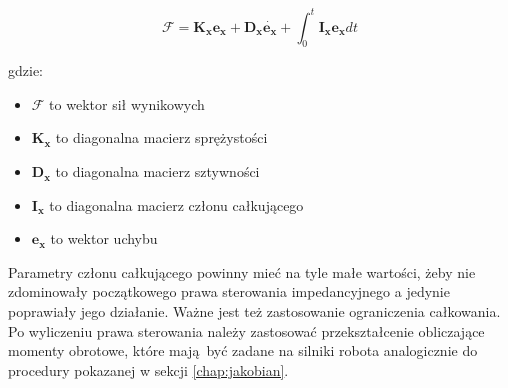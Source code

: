 \begin{equation}
\boldsymbol{\mathcal{F}} = \boldsymbol{K_x}\boldsymbol{e_x} + \boldsymbol{D_x}\dot{\boldsymbol{e_x}} + \int_{0}^{t}  \boldsymbol{I_x}\boldsymbol{e_x}dt
\end{equation}

gdzie:
\begin{itemize}
	\item $\boldsymbol{\mathcal{F}}$ to wektor sił wynikowych
	\item $\boldsymbol{K_x}$ to diagonalna macierz sprężystości
	\item $\boldsymbol{D_x}$ to diagonalna macierz sztywności
	\item $\boldsymbol{I_x}$ to diagonalna macierz członu całkującego
	\item $\boldsymbol{e_x}$ to wektor uchybu
\end{itemize}

Parametry członu całkującego powinny mieć na tyle małe wartości, żeby 
nie zdominowały początkowego prawa sterowania impedancyjnego a jedynie poprawiały jego działanie. Ważne jest też zastosowanie ograniczenia całkowania. Po wyliczeniu prawa sterowania należy zastosować przekształcenie obliczające momenty obrotowe, które mają być zadane na silniki robota analogicznie do procedury pokazanej w sekcji \ref{chap:jakobian}. 


